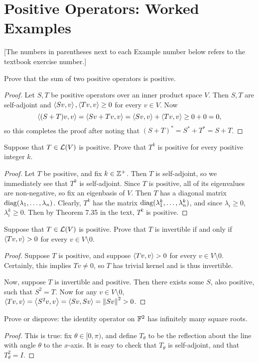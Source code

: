 \documentclass{article}
\begin{document}
\section{Positive Operators: Worked Examples}
[The numbers in parentheses next to each Example number below refers to the textbook exercise number.]
\begin{example}[7C.5]
Prove that the sum of two positive operators is positive.
\end{example}
\begin{proof}
Let $S, T$ be positive operators over an inner product space $V$. Then $S, T$ are self-adjoint and $\left\langle Sv, v\right\rangle, \left\langle Tv, v\right\rangle\geq 0$ for every $v\in V$. Now
$$\left\langle(S+T)v, v\right\rangle = \left\langle Sv + Tv, v\right\rangle = \left\langle Sv, v\right\rangle + \left\langle Tv, v\right\rangle \geq 0 + 0 = 0,$$
so this completes the proof after noting that $(S+T)^* = S^* + T^* = S+T$.
\end{proof}
\begin{example}[7C.6]
Suppose that $T\in\mathcal L(V)$ is positive. Prove that $T^k$ is positive for every positive integer $k$.
\end{example}
\begin{proof}
Let $T$ be positive, and fix $k\in\mathbb Z^+$. Then $T$ is self-adjoint, so we immediately see that $T^k$ is self-adjoint. Since $T$ is positive, all of its eigenvalues are non-negative, so fix an eigenbasis of $V$. Then $T$ has a diagonal matrix $\operatorname{diag}(\lambda_1, \ldots, \lambda_n)$. Clearly, $T^k$ has the matrix $\operatorname{diag}(\lambda_1^k, \ldots, \lambda_n^k)$, and since $\lambda_i\geq 0$, $\lambda_i^k \geq 0$. Then by Theorem 7.35 in the text, $T^k$ is positive.
\end{proof}
\begin{example}[7C.7]
Suppose that $T\in\mathcal L(V)$ is positive. Prove that $T$ is invertible if and only if $\left\langle Tv, v\right\rangle > 0$ for every $v\in V\setminus 0$. 
\end{example}
\begin{proof}
Suppose $T$ is positive, and suppose $\left\langle Tv, v\right\rangle > 0$ for every $v\in V\setminus 0$. Certainly, this implies $Tv \neq 0$, so $T$ has trivial kernel and is thus invertible.

Now, suppose $T$ is invertible and positive. Then there exists some $S$, also positive, such that $S^2 = T$. Now for any $v\in V\setminus 0$, $\left\langle Tv, v\right\rangle = \left\langle S^2v,v\right\rangle = \left\langle Sv, Sv\right\rangle = \left\Vert Sv\right\Vert^2 > 0$.
\end{proof}
\begin{example}[7C.9]
Prove or disprove: the identity operator on $\mathbb F^2$ has infinitely many square roots.
\end{example}
\begin{proof}
This is true: fix $\theta\in [0, \pi)$, and define $T_\theta$ to be the reflection about the line with angle $\theta$ to the $x$-axis. It is easy to check that $T_\theta$ is self-adjoint, and that $T_\theta^2 = I$.
\end{proof}
\end{document}
